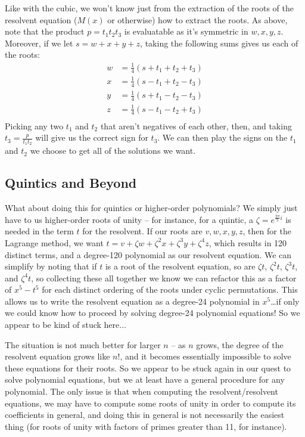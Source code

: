 \documentclass[12pt]{scrartcl}
\begin{document}
Like with the cubic, we won't know just from the extraction of the roots of the resolvent equation ($M(x)$ or otherwise) how to extract the roots. As above, note that the product $p = t_1 t_2 t_3$ is evaluatable as it's symmetric in $w, x, y, z$. Moreover, if we let $s = w + x + y + z$, taking the following sums gives us each of the roots: 
\begin{align*}
    w &= \frac 14 (s + t_1 + t_2 + t_3) \\ 
    x &= \frac 14 (s - t_1 + t_2 - t_3) \\ 
    y &= \frac 14 (s + t_1 - t_2 - t_3) \\ 
    z &= \frac 14 (s - t_1 - t_2 + t_3) \\ 
\end{align*}
Picking any two $t_1$ and $t_2$ that aren't negatives of each other, then, and taking $t_3 = \frac p {t_1 t_2}$ will give us the correct sign for $t_3$. We can then play the signs on the $t_1$ and $t_2$ we choose to get all of the solutions we want. 

\subsection{Quintics and Beyond}
What about doing this for quintics or higher-order polynomials? We simply just have to us higher-order roots of unity -- for instance, for a quintic, a $\zeta = e^{\frac{2\pi}5 i}$ is needed in the term $t$ for the resolvent. If our roots are $v, w, x, y, z$, then for the Lagrange method, we want $t = v + \zeta w + \zeta^2 x + \zeta^3 y + \zeta^4 z$, which results in 120 distinct terms, and a degree-120 polynomial as our resolvent equation. We can simplify by noting that if $t$ is a root of the resolvent equation, so are $\zeta t$, $\zeta^2 t$, $\zeta^3 t$, and $\zeta^4 t$, so collecting these all together we know we can refactor this as a factor of $x^5 - t^5$ for each distinct ordering of the roots under cyclic permutations. This allows us to write the resolvent equation as a degree-24 polynomial in $x^5$\dots if only we could know how to proceed by solving degree-24 polynomial equations! So we appear to be kind of stuck here...

The situation is not much better for larger $n$ -- as $n$ grows, the degree of the resolvent equation grows like $n!$, and it becomes essentially impossible to solve these equations for their roots. So we appear to be stuck again in our quest to solve polynomial equations, but we at least have a general procedure for any polynomial. The only issue is that when computing the resolvent/resolvent equations, we may have to compute some roots of unity in order to compute its coefficients in general, and doing this in general is not necessarily the easiest thing (for roots of unity with factors of primes greater than 11, for instance). 
\end{document}

